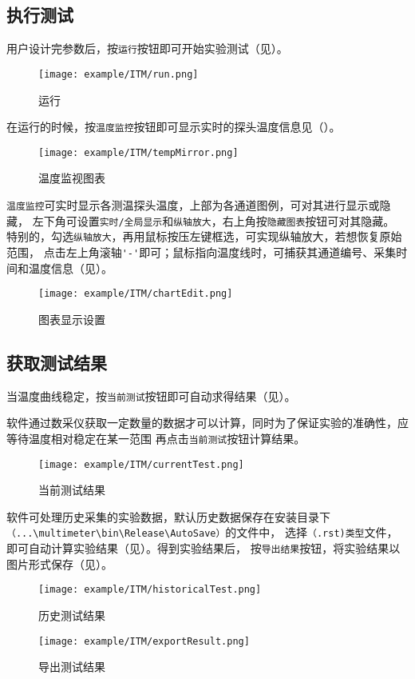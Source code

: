 \subsection{执行测试}
用户设计完参数后，按\lstinline{运行}按钮即可开始实验测试（见）。
\begin{figure}[htbp]
	\centering
	\texttt{[image: example/ITM/run.png]}
	\caption{ 运行 \label{fig:exmp_itm_run}}
\end{figure}
在运行的时候，按\lstinline{温度监控}按钮即可显示实时的探头温度信息见（）。
\begin{figure}[htbp]
	\centering
	\texttt{[image: example/ITM/tempMirror.png]}
	\caption{ 温度监视图表 \label{fig:exmp_itm_tempMirror}}
\end{figure}
\lstinline{温度监控}可实时显示各测温探头温度，上部为各通道图例，可对其进行显示或隐藏，
左下角可设置\lstinline{实时/全局显示}和\lstinline{纵轴放大}，右上角按\lstinline{隐藏图表}按钮可对其隐藏。
特别的，勾选\lstinline{纵轴放大}，再用鼠标按压左键框选，可实现纵轴放大，若想恢复原始范围，
点击左上角滚轴\lstinline{'-'}即可；鼠标指向温度线时，可捕获其通道编号、采集时间和温度信息（见）。\\
\begin{figure}[htbp]
	\centering
	\texttt{[image: example/ITM/chartEdit.png]}
	\caption{ 图表显示设置 \label{fig:exmp_itm_chartEdit}}
\end{figure}

\subsection{获取测试结果}
	当温度曲线稳定，按\lstinline{当前测试}按钮即可自动求得结果（见）。
\begin{note}
	软件通过数采仪获取一定数量的数据才可以计算，同时为了保证实验的准确性，应等待温度相对稳定在某一范围
再点击\lstinline{当前测试}按钮计算结果。
\end{note}
\begin{figure}[htbp]
	\centering
	\texttt{[image: example/ITM/currentTest.png]}
	\caption{ 当前测试结果 \label{fig:exmp_itm_currentTest}}
\end{figure}
软件可处理历史采集的实验数据，默认历史数据保存在安装目录下\lstinline{（...\multimeter\bin\Release\AutoSave）}的文件中，
选择\lstinline{（.rst)类型}文件，即可自动计算实验结果（见）。得到实验结果后，
按\lstinline{导出结果}按钮，将实验结果以图片形式保存（见）。
\begin{figure}[htbp]
	\centering
	\texttt{[image: example/ITM/historicalTest.png]}
	\caption{ 历史测试结果 \label{fig:exmp_itm_historicalTest}}
\end{figure}

\begin{figure}[htbp]
	\centering
	\texttt{[image: example/ITM/exportResult.png]}
	\caption{ 导出测试结果 \label{fig:exmp_itm_exportResult}}
\end{figure}